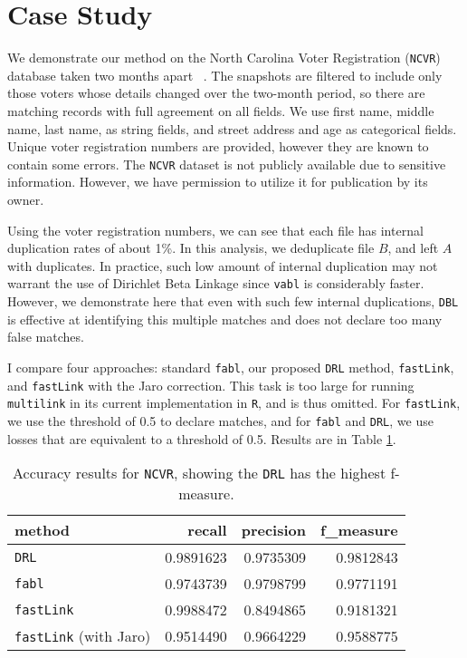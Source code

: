 \documentclass[12pt,letterpaper]{article}
\newcommand{\1}[1]{\mathbb{I}\!\left[#1\right]} %
\begin{document}
\section{Case Study}\label{sec:case-study}

We demonstrate our method on the North Carolina Voter Registration (\texttt{NCVR}) database taken two months apart ~\citep{christen_preparation_2014}. The snapshots are filtered to include only those voters whose details changed over the two-month period, so there are matching records with full agreement on all fields. We use first name, middle name, last name, as string fields, and street address and age as categorical fields. Unique voter registration numbers are provided, however they are known to contain some errors. The \texttt{NCVR} dataset is not publicly available due to sensitive information. However, we have permission to utilize it for publication by its owner.

Using the voter registration numbers, we can see that each file has internal duplication rates of about 1\%. In this analysis, we deduplicate file $B$, and left $A$ with duplicates. In practice, such low amount of internal duplication may not warrant the use of Dirichlet Beta Linkage since \texttt{vabl} is considerably faster. However, we demonstrate here that even with such few internal duplications, \texttt{DBL} is effective at identifying this multiple matches and does not declare too many false matches. 

I compare four approaches: standard \texttt{fabl}, our proposed \texttt{DRL} method, \texttt{fastLink}, and \texttt{fastLink} with the Jaro correction. This task is too large for running \texttt{multilink} in its current implementation in \texttt{R}, and is thus omitted. For \texttt{fastLink}, we use the threshold of 0.5 to declare matches, and for \texttt{fabl} and \texttt{DRL}, we use losses that are equivalent to a threshold of 0.5. Results are in Table \ref{table:ncvr_results}.

\begin{table}[t]
	\centering
	\begin{tabular}{l|rrr}
		method & recall & precision & f\_measure\\
		\hline
		\texttt{DRL} & 0.9891623 & 0.9735309 & 0.9812843\\
		\hline
		\texttt{fabl} & 0.9743739 & 0.9798799 & 0.9771191\\
		\hline
		\texttt{fastLink} & 0.9988472 & 0.8494865 & 0.9181321\\
		\hline
		\texttt{fastLink} (with Jaro) & 0.9514490 & 0.9664229 & 0.9588775\\
	\end{tabular}
	\caption{Accuracy results for \texttt{NCVR}, showing the \texttt{DRL} has the highest f-measure.}
	\label{table:ncvr_results}
\end{table}
\end{document}

